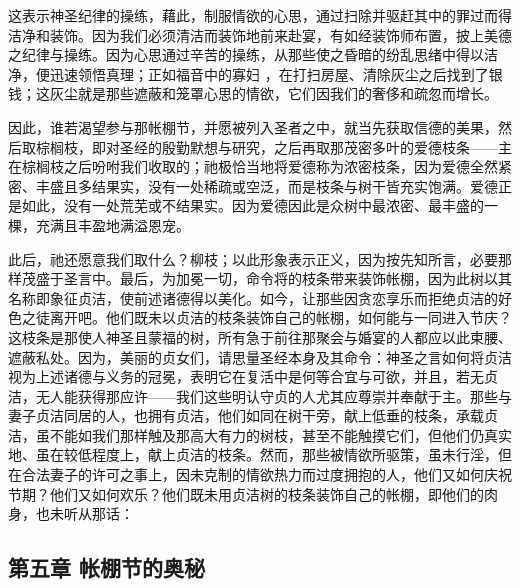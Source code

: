   这表示神圣纪律的操练，藉此，制服情欲的心思，通过扫除并驱赶其中的罪过而得洁净和装饰。因为我们必须清洁而装饰地前来赴宴，有如经装饰师布置，披上美德之纪律与操练。因为心思通过辛苦的操练，从那些使之昏暗的纷乱思绪中得以洁净，便迅速领悟真理；正如福音中的寡妇 ，在打扫房屋、清除灰尘之后找到了银钱；这灰尘就是那些遮蔽和笼罩心思的情欲，它们因我们的奢侈和疏忽而增长。\par

因此，谁若渴望参与那帐棚节，并愿被列入圣者之中，就当先获取信德的美果，然后取棕榈枝，即对圣经的殷勤默想与研究，之后再取那茂密多叶的爱德枝条——主在棕榈枝之后吩咐我们收取的；祂极恰当地将爱德称为浓密枝条，因为爱德全然紧密、丰盛且多结果实，没有一处稀疏或空泛，而是枝条与树干皆充实饱满。爱德正是如此，没有一处荒芜或不结果实。因为爱德因此是众树中最浓密、最丰盛的一棵，充满且丰盈地满溢恩宠。\par

此后，祂还愿意我们取什么？柳枝；以此形象表示正义，因为按先知所言，必要那样茂盛于圣言中。最后，为加冕一切，命令将的枝条带来装饰帐棚，因为此树以其名称即象征贞洁，使前述诸德得以美化。如今，让那些因贪恋享乐而拒绝贞洁的好色之徒离开吧。他们既未以贞洁的枝条装饰自己的帐棚，如何能与一同进入节庆？这枝条是那使人神圣且蒙福的树，所有急于前往那聚会与婚宴的人都应以此束腰、遮蔽私处。因为，美丽的贞女们，请思量圣经本身及其命令：神圣之言如何将贞洁视为上述诸德与义务的冠冕，表明它在复活中是何等合宜与可欲，并且，若无贞洁，无人能获得那应许——我们这些明认守贞的人尤其应尊崇并奉献于主。那些与妻子贞洁同居的人，也拥有贞洁，他们如同在树干旁，献上低垂的枝条，承载贞洁，虽不能如我们那样触及那高大有力的树枝，甚至不能触摸它们，但他们仍真实地、虽在较低程度上，献上贞洁的枝条。然而，那些被情欲所驱策，虽未行淫，但在合法妻子的许可之事上，因未克制的情欲热力而过度拥抱的人，他们又如何庆祝节期？他们又如何欢乐？他们既未用贞洁树的枝条装饰自己的帐棚，即他们的肉身，也未听从那话：\par


\subsection{第五章 帐棚节的奥秘}

